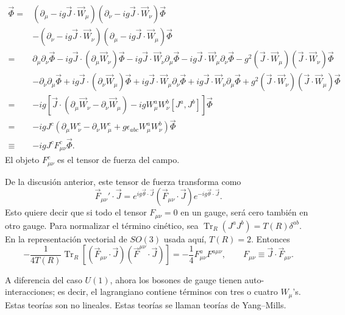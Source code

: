 \documentclass[11pt,a4paper]{article}
\newcommand{\concept}[1]{\textcolor{concept-green}{#1}}
\newcommand{\Tr}{\operatorname{Tr}}
\begin{document}
\begin{align*}
  [D_\mu,D_\nu]\vec\Phi
  ={}&
  (\partial_\mu-ig\vec J\cdot\vec W_\mu)
  (\partial_\nu-ig\vec J\cdot\vec W_\nu)\vec\Phi\\
  &-(\partial_\nu-ig\vec J\cdot\vec W_\nu)
  (\partial_\mu-ig\vec J\cdot\vec W_\mu)\vec\Phi\\[0.3em]
  ={}&
  \partial_\mu\partial_\nu\vec\Phi
  -ig\vec J\cdot(\partial_\mu\vec W_\nu)\vec\Phi
  -ig\vec J\cdot\vec W_\nu\partial_\mu\vec\Phi
  -ig\vec J\cdot\vec W_\mu\partial_\nu\vec\Phi
  -g^2(\vec J\cdot\vec W_\mu)(\vec J\cdot\vec W_\nu)\vec\Phi\\
  &-\partial_\nu\partial_\mu\vec\Phi
  +ig\vec J\cdot(\partial_\nu\vec W_\mu)\vec\Phi
  +ig\vec J\cdot\vec W_\mu\partial_\nu\vec\Phi
  +ig\vec J\cdot\vec W_\nu\partial_\mu\vec\Phi
  +g^2(\vec J\cdot\vec W_\nu)(\vec J\cdot\vec W_\mu)\vec\Phi\\
  ={}&-ig\left[
       \vec J\cdot(\partial_\mu\vec W_\nu-\partial_\nu\vec W_\mu)
       -igW_\mu^aW_\nu^b[J^a,J^b]
     \right]\vec\Phi\\
  ={}&-igJ^c\left(
      \partial_\mu W_\nu^c-\partial_\nu W_\mu^c
      +g\epsilon_{abc}W_\mu^aW_\nu^b
    \right)\vec\Phi\\
  \equiv{}&-igJ^cF_{\mu\nu}^c\vec\Phi.
\end{align*}
El objeto $F_{\mu\nu}^c$ es el \concept{tensor de fuerza del campo}.

De la discusión anterior, este tensor de fuerza transforma como
\[
  \vec F_{\mu\nu}'\cdot\vec J
  =e^{ig\vec\theta\cdot\vec J}
    (\vec F_{\mu\nu}\cdot\vec J)
    e^{-ig\vec\theta\cdot\vec J}.
\]
Esto quiere decir que si todo el tensor $F_{\mu\nu}=0$ en un gauge, será cero también en otro
gauge. Para normalizar el término cinético, sea
$\Tr_R(J^aJ^b)=T(R)\delta^{ab}$. En la representación vectorial
de $SO(3)$ usada aquí, $T(R)=2$. Entonces
\[
  -\frac{1}{4T(R)}\Tr_R\left[
    (\vec F_{\mu\nu}\cdot\vec J)
    (\vec F^{\mu\nu}\cdot\vec J)
  \right]
  =-\frac14F_{\mu\nu}^aF^{a\mu\nu},
  \qquad
  F_{\mu\nu}\equiv\vec J\cdot\vec F_{\mu\nu}.
\]

A diferencia del caso $U(1)$, ahora los bosones de gauge tienen
auto-interacciones; es decir, el lagrangiano contiene términos con tres o
cuatro $W_\mu$'s. Estas teorías son no lineales. Estas teorías se llaman
teorías de \concept{Yang--Mills}.
\end{document}
